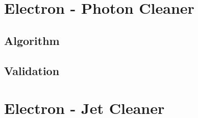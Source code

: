 \documentclass{cmspaper}
\begin{document}
\section{Electron - Photon Cleaner}
\subsection{Algorithm}
\subsection{Validation}

\section{Electron - Jet Cleaner}%
\end{document}
